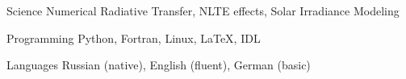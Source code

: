 

\begin{cvskills}

  \cvskill
    {Science} %
    {Numerical Radiative Transfer, NLTE effects, Solar Irradiance Modeling} %

  \cvskill
    {Programming} %
    {Python, Fortran, Linux, LaTeX, IDL} %

  \cvskill
    {Languages} %
    {Russian (native), English (fluent), German (basic)} %

\end{cvskills}
